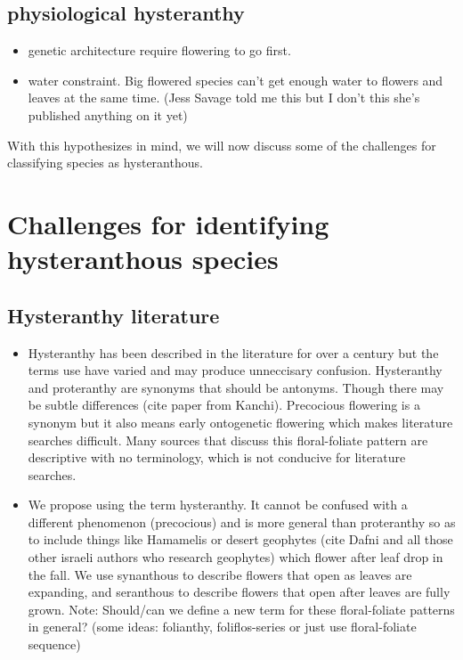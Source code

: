 \documentclass{article}\usepackage[]{graphicx}\usepackage[]{color}
\begin{document}
\subsection {physiological hysteranthy}
\begin {itemize}
\item genetic architecture require flowering to go first.
\item water constraint. Big flowered species can't get enough water to flowers and leaves at the same time. (Jess Savage told me this but I don't this she's published anything on it yet)
\end{itemize}
With this hypothesizes in mind, we will now discuss some of the challenges for classifying species as hysteranthous.

\section*{Challenges for identifying hysteranthous species}
\subsection*{Hysteranthy literature}
\begin{itemize}
\item Hysteranthy has been described in the literature for over a century but the terms use have varied and may produce unneccisary confusion. Hysteranthy and proteranthy are synonyms that should be antonyms. Though there may be subtle differences (cite paper from Kanchi). Precocious flowering is a synonym but it also means early ontogenetic flowering which makes literature searches difficult. Many sources that discuss this floral-foliate pattern are descriptive with no terminology, which is not conducive for literature searches.
\item We propose using the term hysteranthy. It cannot be confused with a different phenomenon (precocious) and is more general than proteranthy so as to include things like Hamamelis or desert geophytes (cite Dafni and all those other israeli authors who research geophytes) which flower after leaf drop in the fall. We use synanthous to describe flowers that open as leaves are expanding, and seranthous to describe flowers that open after leaves are fully grown. Note: Should/can we define a new term for these floral-foliate patterns in general? (some ideas: folianthy, foliflos-series or just use floral-foliate sequence)
\end{itemize}
\end{document}
